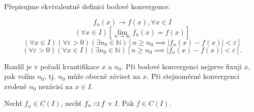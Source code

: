 \begin{poznamka}
  Přepisujme ekvivalentně definici bodové konvergence.

  $$f_n(x) \to f(x), \forall x \in I$$
  $$(\forall x \in I)[\lim_{n\to \infty} f_n(x)=f(x)]$$
  $$(\forall x \in I)(\forall \varepsilon > 0)(\exists n_0 \in \mathbb N)[n\geq n_0 \implies |f_n(x)-f(x)|<\varepsilon]$$
  $$(\forall \varepsilon > 0)(\forall x \in I)(\exists n_0 \in \mathbb N)[n\geq n_0 \implies |f_n(x)-f(x)|<\varepsilon].$$

  Rozdíl je v pořadí kvantifikace $x$ a $n_0$. Při bodové konvergenci nejprve fixuji $x$, pak volím $n_0$, tj. $n_0$ může obecně záviset na $x$. Při stejnoměrné konvergenci zvolené $n_0$ nezávisí na $x \in I$.
\end{poznamka}

\begin{veta}\label{16zachspoj}
  Nechť $f_n \in C(I)$, nechť $f_n \operatorname{\rightrightarrows} f$ v $I$. Pak $f \in C(I)$.
\end{veta}

